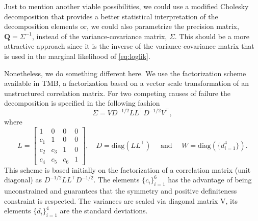 Just to mention another viable possibilities, we could use a modified
Cholesky decomposition \cite{modifiedcholesky} that provides a better
statistical interpretation of the decomposition elements or, we could
also parametrize the precision matrix, \(\bm{Q} = \Sigma^{-1}\), instead
of the variance-covariance matrix, \(\Sigma\). This should be a more
attractive approach since it is the inverse of the variance-covariance
matrix that is used in the marginal likelihood of \autoref{eq:loglik}.

Nonetheless, we do something different here. We use the factorization
scheme available in TMB, a factorization based on a vector scale
transformation of an unstructured correlation matrix. For two competing
causes of failure the decomposition is specified in the following
fashion
\[
  \Sigma = VD^{-1/2}LL^{\top}D^{-1/2}V^{\top},
\]
where
\[
  L =
  \begin{bmatrix}
    1&0&0&0\\
    c_{1}&1&0&0\\
    c_{2}&c_{3}&1&0\\
    c_{4}&c_{5}&c_{6}&1
  \end{bmatrix},\quad D = \text{diag}(LL^{\top})\quad
  \text{ and }\quad W = \text{diag}(\{d_{i=1}^{4}\}).
\]
This scheme is based initially on the factorization of a correlation
matrix (unit diagonal) as \(D^{-1/2}LL^{\top}D^{-1/2}\). The elements
\(\{c_{i}\}_{i=1}^{6}\) has the advantage of being unconstrained and
guarantees that the symmetry and positive definiteness constraint is
respected. The variances are scaled via diagonal matrix V, its elements
\(\{d_{i}\}_{i=1}^{4}\) are the standard deviations.

